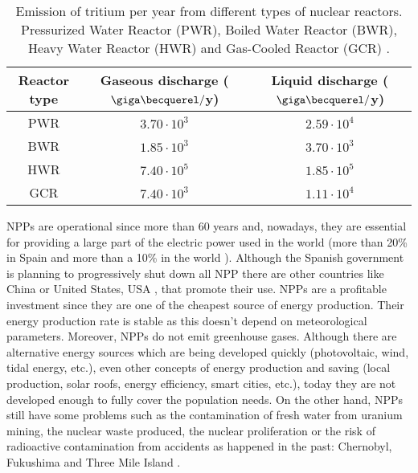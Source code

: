 \begin{table}[htbp]
\begin{center}
\begin{tabular}{|c|c|c|}
\hline
Reactor type & Gaseous discharge ($\giga\becquerel/$y) & Liquid discharge ($\giga\becquerel/$y) \\
\hline \hline \hline
PWR & $3.70\cdot 10^{3}$ & $2.59\cdot 10^{4}$ \\ \hline
BWR & $1.85\cdot 10^{3}$ & $3.70\cdot 10^{3}$ \\ \hline
HWR & $7.40\cdot 10^{5}$ & $1.85\cdot 10^{5}$ \\ \hline
GCR & $7.40\cdot 10^{3}$ & $1.11\cdot 10^{4}$ \\ \hline
\end{tabular}
\caption{Emission of tritium per year from different types of nuclear reactors. Pressurized Water Reactor (PWR), Boiled Water Reactor (BWR), Heavy Water Reactor (HWR) and Gas-Cooled Reactor (GCR) \cite{CommonEmissionTritium}.}
\label{tab:TritiumEmisionsNPPs}
\end{center}
\end{table} 

NPPs are operational since more than 60 years and, nowadays, they are essential for providing a large part of the electric power used in the world (more than 20\% in Spain \cite{PercentageEnergySpain} and more than a 10\% in the world \cite{PercentageEnergyWorld}). Although the Spanish government is planning to progressively shut down all NPP there are other countries like China \cite{60ReactorsChina} or United States, USA \cite{35MillionsUSA}, that promote their use. NPPs are a profitable investment since they are one of the cheapest source of energy production. Their energy production rate is stable as this doesn't depend on meteorological parameters. Moreover, NPPs do not emit greenhouse gases. Although there are alternative energy sources which are being developed quickly (photovoltaic, wind, tidal energy, etc.), even other concepts of energy production and saving (local production, solar roofs, energy efficiency, smart cities, etc.), today they are not developed enough to fully cover the population needs. On the other hand, NPPs still have some problems such as the contamination of fresh water from uranium mining, the nuclear waste produced, the nuclear proliferation or the risk of radioactive contamination from accidents as happened in the past: Chernobyl, Fukushima and Three Mile Island \cite{ThreeMileIsland}.

